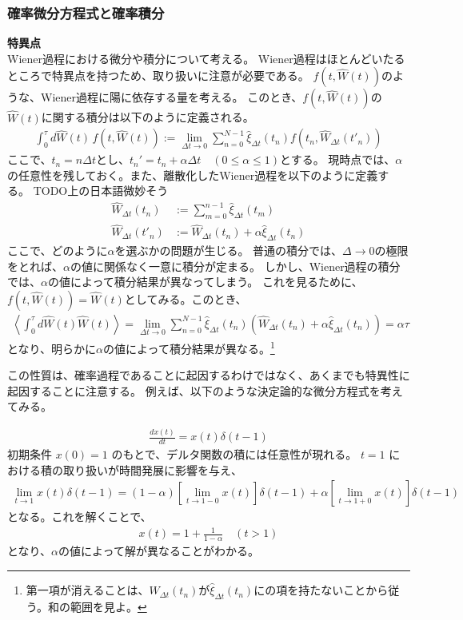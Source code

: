 \documentclass[a4paper,11pt]{jsarticle}
\numberwithin{equation}{section}
\begin{document}
\subsubsection{確率微分方程式と確率積分}
\textbf{特異点}\\
Wiener過程における微分や積分について考える。
Wiener過程はほとんどいたるところで特異点を持つため、取り扱いに注意が必要である。
$f(t,\hat{W}(t))$のような、Wiener過程に陽に依存する量を考える。
このとき、$f(t,\hat{W}(t))$の$\hat{W}(t)$に関する積分は以下のように定義される。
\begin{align}
\int_0^\tau d\hat{W}(t)\, f(t, \hat{W}(t)) := \lim_{\Delta t \to 0} \sum_{n=0}^{N-1} \hat{\xi}_{\Delta t}(t_n) f(t_n, \hat{W}_{\Delta t}(t'_n)) 
\end{align}
ここで、$t_n = n\Delta t$とし、$t_{n}'=t_{n} + \alpha \Delta t\quad (0\leq \alpha \leq 1)$とする。
現時点では、$\alpha$の任意性を残しておく。また、離散化したWiener過程を以下のように定義する。
TODO上の日本語微妙そう
\begin{align}
\hat{W}_{\Delta t}(t_n) &:= \sum_{m=0}^{n-1} \hat{\xi}_{\Delta t}(t_m) \\
\hat{W}_{\Delta t}(t'_n) &:= \hat{W}_{\Delta t}(t_n) + \alpha \hat{\xi}_{\Delta t}(t_n)
\end{align}
ここで、どのように$\alpha$を選ぶかの問題が生じる。
普通の積分では、$\Delta \to 0$の極限をとれば、$\alpha$の値に関係なく一意に積分が定まる。
しかし、Wiener過程の積分では、$\alpha$の値によって積分結果が異なってしまう。
これを見るために、$f(t,\hat{W}(t)) = \hat{W}(t)$としてみる。このとき、
\begin{align}
\left\langle \int_0^\tau d\hat{W}(t) \hat{W}(t) \right\rangle 
= \lim_{\Delta t \to 0} \sum_{n=0}^{N-1} \hat{\xi}_{\Delta t}(t_n) \left( \hat{W}_{\Delta t}(t_n) + \alpha \hat{\xi}_{\Delta t}(t_n) \right)
= \alpha \tau
\end{align}
となり、明らかに$\alpha$の値によって積分結果が異なる。\footnote{第一項が消えることは、$\hat{W}_{\Delta t}(t_n)$が$\hat{\xi}_{\Delta t}(t_n)$にの項を持たないことから従う。和の範囲を見よ。}

この性質は、確率過程であることに起因するわけではなく、あくまでも特異性に起因することに注意する。
例えば、以下のような決定論的な微分方程式を考えてみる。

\begin{align}
\frac{dx(t)}{dt} = x(t)\delta(t - 1)
\end{align}
初期条件 $x(0) = 1$ のもとで、デルタ関数の積には任意性が現れる。
$t = 1$ における積の取り扱いが時間発展に影響を与え、
\begin{align}
\lim_{t \to 1} x(t)\delta(t - 1)
= (1 - \alpha) \left[ \lim_{t \to 1 - 0} x(t) \right] \delta(t - 1)
+ \alpha \left[ \lim_{t \to 1 + 0} x(t) \right] \delta(t - 1)
\end{align}
となる。これを解くことで、
\begin{align}
  x(t) = 1 + \frac{1}{1 - \alpha} \quad (t > 1)
\end{align}
となり、$\alpha$の値によって解が異なることがわかる。
\end{document}
